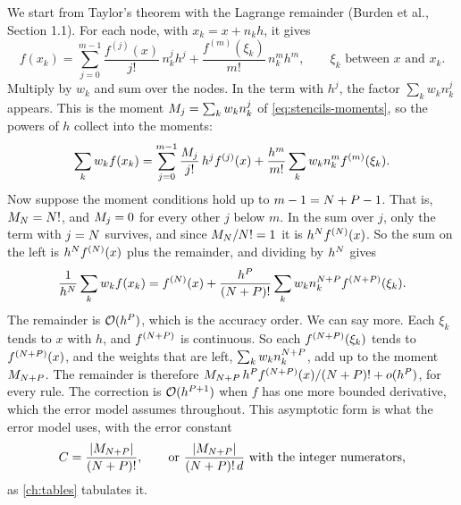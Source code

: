 We start from Taylor's theorem with the Lagrange remainder (Burden et al.,\cite{burden2016} Section 1.1). For each
node, with $x_k = x + n_k h$, it gives
\[
  f(x_k) = \sum_{j=0}^{m-1} \frac{f^{(j)}(x)}{j!}\, n_k^j h^j + \frac{f^{(m)}(\xi_k)}{m!}\, n_k^m h^m,
  \qquad \xi_k \text{ between } x \text{ and } x_k .
\]
Multiply by $w_k$ and sum over the nodes. In the term with $h^j$, the factor $\sum_k w_k n_k^j$ appears. This is
the moment $M_{j} = \sum_k w_k n_k^j$ of \cref{eq:stencils-moments}, so the powers of $h$ collect into the
moments:
\begin{equation}
  \sum_k w_k f(x_k) = \sum_{j=0}^{m-1} \frac{M_{j}}{j!}\, h^j f^{(j)}(x) + \frac{h^m}{m!} \sum_k w_k n_k^m f^{(m)}(\xi_k).
  \label{eq:derivations-taylor}
\end{equation}
Now suppose the moment conditions hold up to $m - 1 = N + P - 1$. That is, $M_{N} = N!$,
and $M_{j} = 0$ for every other $j$ below $m$. In the sum over $j$, only the term with $j = N$ survives, and
since $M_{N} / N! = 1$ it is $h^{N} f^{(N)}(x)$. So the sum on the left is
$h^{N} f^{(N)}(x)$ plus the remainder, and dividing by $h^{N}$ gives
\[
  \frac{1}{h^{N}} \sum_k w_k f(x_k) = f^{(N)}(x) + \frac{h^{P}}{(N + P)!}
  \sum_k w_k n_k^{N + P} f^{(N + P)}(\xi_k).
\]
The remainder is $\mathcal{O}(h^{P})$, which is the accuracy order. We can say more. Each $\xi_k$ tends to $x$ with
$h$, and $f^{(N + P)}$ is continuous. So each $f^{(N + P)}(\xi_k)$ tends to
$f^{(N + P)}(x)$, and the weights that are left, $\sum_k w_k n_k^{N + P}$, add up to the moment
$M_{N + P}$. The remainder is therefore $M_{N + P}\, h^{P}
f^{(N + P)}(x) / (N + P)! + o(h^{P})$, for every
rule. The correction is $\mathcal{O}(h^{P + 1})$ when $f$ has one more bounded derivative, which the error
model assumes throughout. This asymptotic form is what the error model uses, with the error constant
\begin{equation}
  C = \frac{\lvert M_{N + P} \rvert}{(N + P)!}, \qquad
  \text{or } \frac{\lvert M_{N + P} \rvert}{(N + P)!\,d} \text{ with the integer numerators,}
  \label{eq:derivations-errc}
\end{equation}
as \cref{ch:tables} tabulates it.

